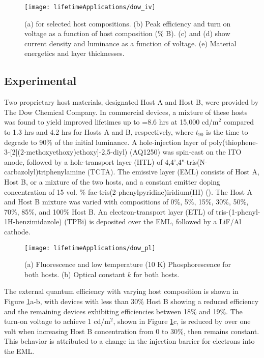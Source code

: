 \documentclass[../thesis.tex]{subfiles}
\begin{document}
\begin{figure}[ht]
\centering
\texttt{[image: lifetimeApplications/dow\_iv]}
\caption{(a) \eqe for selected host compositions. (b) Peak efficiency and turn on voltage as a function of host composition (\% B). (c) and (d) show current density and luminance as a function of voltage. (e) Material energetics and layer thicknesses.}
\label{fig:dow_iv}
\end{figure}

\subsection{Experimental}
Two proprietary host materials, designated Host A and Host B, were provided by The Dow Chemical Company. 
In commercial devices, a mixture of these hosts was found to yield improved lifetimes up to =8.6 hrs at 15,000 cd/m$^2$ compared to 1.3 hrs and 4.2 hrs for Hosts A and B, respectively, where $t_{90}$ is the time to degrade to 90\% of the initial luminance. 
A hole-injection layer of poly(thiophene-3-[2[(2-methoxyethoxy)ethoxy]-2,5-diyl) (AQ1250) was spin-cast on the ITO anode, followed by a hole-transport layer (HTL) of 4,4',4"-tris(N-carbazolyl)triphenylamine (TCTA). 
The emissive layer (EML) consists of Host A, Host B, or a mixture of the two hosts, and a constant emitter doping concentration of 15 vol. \% fac-tris(2-phenylpyridine)iridium(III) (\irppy). 
The Host A and Host B mixture was varied with compositions of 0\%, 5\%, 15\%, 30\%, 50\%, 70\%, 85\%, and 100\% Host B. 
An electron-transport layer (ETL) of tris-(1-phenyl-1H-benzimidazole) (TPBi) is deposited over the EML, followed by a LiF/Al cathode. 

\begin{wrapfigure}{r}{.6\textwidth}
\centering
\texttt{[image: lifetimeApplications/dow\_pl]}
\caption{(a) Fluorescence and low temperature (10 K) Phosphorescence for both hosts. (b) Optical constant $k$ for both hosts.}
\label{fig:dow_pl}
\end{wrapfigure}
The external quantum efficiency with varying host composition is shown in Figure \ref{fig:dow_iv}a-b, with devices with less than 30\% Host B showing a reduced efficiency and the remaining devices exhibiting efficiencies between 18\% and 19\%. The turn-on voltage to achieve 1 cd/m$^2$, shown in Figure \ref{fig:dow_iv}c, is reduced by over one volt when increasing Host B concentration from 0 to 30\%, then remains constant. 
This behavior is attributed to a change in the injection barrier for electrons into the EML. 
\end{document}
